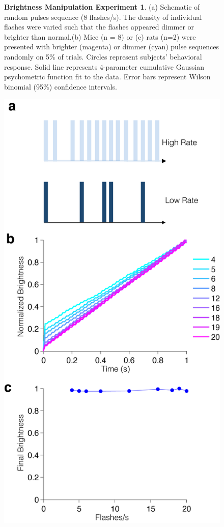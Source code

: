 \begin{figure}
  \caption[Brightness Manipulation Experiment 1]{\textbf{Brightness Manipulation Experiment 1}. (a) Schematic of random pulses sequence (8 flashes/s). The density of individual flashes were varied such that the flashes appeared dimmer or brighter than normal.(b) Mice (n = 8) or (c) rats (n=2) were presented with brighter (magenta) or dimmer (cyan) pulse sequences randomly on 5\% of trials. Circles represent subjects' behavioral response. Solid line represents 4-parameter cumulative Gaussian psychometric function fit to the data. Error bars represent Wilson binomial (95\%) confidence intervals.}
   \label{fig:brightness_exp1}
\end{figure}

\begin{figure}
  \centering
  	\includegraphics[width=\textwidth,height=0.8\textheight,keepaspectratio]{Figures/chapter2/brightness_simulation_scaled.png}

\end{figure}
